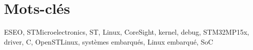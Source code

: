 
\section*{Mots-clés}
\label{pref:keywords}

ESEO, STMicroelectronics, ST, Linux, CoreSight, kernel, debug, STM32MP15x, driver, C,
OpenSTLinux, systèmes embarqués, Linux embarqué, SoC 
